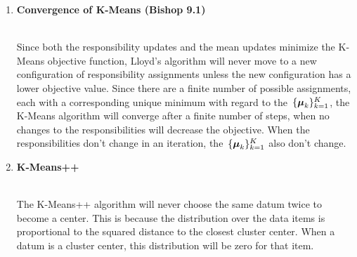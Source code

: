 \documentclass[12pt,letterpaper]{article}
\begin{document}
\begin{enumerate}
\newpage

\item {\bf Convergence of K-Means (Bishop 9.1)}\\
 \\

\begin{solution}
Since both the responsibility updates and the mean updates minimize the K-Means objective function, Lloyd's algorithm will never move to a new configuration of responsibility assignments unless the new configuration has a lower objective value.  Since there are a finite number of possible assignments, each with a corresponding unique minimum with regard to the~$\{\boldsymbol{\mu}_k\}^K_{k=1}$, the K-Means algorithm will converge after a finite number of steps, when no changes to the responsibilities will decrease the objective.  When the responsibilities don't change in an iteration, the~$\{\boldsymbol{\mu}_k\}^K_{k=1}$ also don't change.
\end{solution}

\item {\bf K-Means++ }\\
 \\

\begin{solution}
The K-Means++ algorithm will never choose the same datum twice to become a center.  This is because the distribution over the data items is proportional to the squared distance to the closest cluster center.  When a datum is a cluster center, this distribution will be zero for that item.
\\
\end{solution}
\fi

\vspace{3 in}


\end{enumerate}
\end{document}
